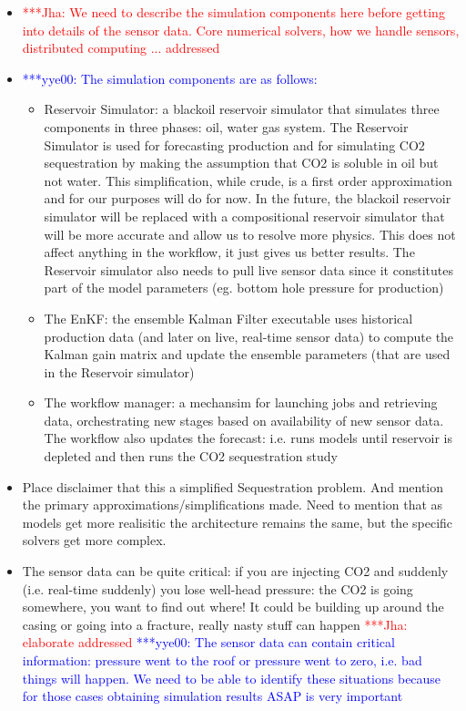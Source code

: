 \documentclass[conference,final]{IEEEtran}
\newcommand{\jhanote}[1]{ {\textcolor{red} { ***Jha: #1 }}}
\newcommand{\yyenote}[1]{ {\textcolor{blue} { ***yye00: #1 }}}
\newcommand{\jhanote}[1]{}
\newcommand{\yyenote}[1]{}
\begin{document}
\begin{itemize}
\item \jhanote{We need to describe the simulation components here before getting into details of
   the sensor data. Core numerical solvers, how we handle sensors, distributed computing ... addressed}
\item \yyenote{ The simulation components are as follows:}
  \begin{itemize}
    \item Reservoir Simulator: a blackoil reservoir simulator that simulates three components in three phases: oil, water gas system. The Reservoir Simulator is used for forecasting production and for simulating CO2 sequestration by making the assumption that CO2 is soluble in oil but not water. This simplification, while crude, is a first order approximation and for our purposes will do for now. In the future, the blackoil reservoir simulator will be replaced with a compositional reservoir simulator that will be more accurate and allow us to resolve more physics. This does not affect anything in the workflow, it just gives us better results. The Reservoir simulator also needs to pull live sensor data since it constitutes part of the model parameters (eg. bottom hole pressure for production)
    \item The EnKF: the ensemble Kalman Filter executable uses historical production data (and later on live, real-time sensor data) to compute the Kalman gain matrix and update the ensemble parameters (that are used in the Reservoir simulator)
    \item The workflow manager: a mechansim for launching jobs and retrieving data, orchestrating new stages based on availability of new sensor data. The workflow also updates the forecast: i.e. runs models until reservoir is depleted and then runs the CO2 sequestration study
  \end{itemize}


\item Place disclaimer that this a simplified Sequestration problem. And mention the primary approximations/simplifications made. Need to mention that as models get more realisitic the architecture remains the same, but the specific solvers get more complex.

\item The sensor data can be quite critical: if you are injecting CO2 and suddenly (i.e. real-time suddenly) you lose well-head pressure: the CO2 is going somewhere, you want to find out where! It could be building up around the casing or going into a fracture, really nasty stuff can happen \jhanote{elaborate  addressed} \yyenote{The sensor data can contain critical information: pressure went to the roof or pressure went to zero, i.e. bad things will happen. We need to be able to identify these situations because for those cases obtaining simulation results ASAP is very important}


\end{itemize}
\end{document}
